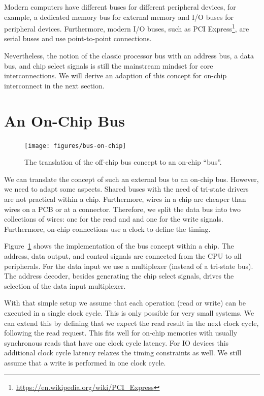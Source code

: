 \documentclass[%
    10pt,
    headinclude, footexclude,
    openright, %
    notitlepage,
    cleardoubleempty,
    headsepline,
    pointlessnumbers,
    bibtotoc, idxtotoc,
    ]{scrbook}
\newcommand{\myref}[2]{\href{#1}{#2}}
\renewcommand{\myref}[2]{{#2}{\footnote{\url{#1}}}}
\begin{document}
Modern computers have different buses for different peripheral devices, for example, a dedicated memory
bus for external memory and I/O buses for peripheral devices.
Furthermore, modern I/O buses, such as \myref{https://en.wikipedia.org/wiki/PCI_Express}{PCI Express},
are serial buses and use point-to-point connections.

Nevertheless, the notion of the classic processor bus with an address bus, a data bus, and chip select signals
is still the mainstream mindset for core interconnections. We will derive an adaption of this concept for
on-chip interconnect in the next section.

\section{An On-Chip Bus}

\begin{figure}
  \centering
  \texttt{[image: figures/bus-on-chip]}
  \caption{The translation of the off-chip bus concept to an on-chip ``bus''.}
  \label{fig:bus-on-chip}
\end{figure}

We can translate the concept of such an external bus to an on-chip bus. However, we need to adapt some aspects.
Shared buses with the need of tri-state drivers are not practical within a chip. Furthermore,
wires in a chip are cheaper than wires on a PCB or at a connector. Therefore, we split the data bus
into two collections of wires: one for the read and and one for the write signals.
Furthermore, on-chip connections use a clock to define the timing.

Figure~\ref{fig:bus-on-chip} shows the implementation of the bus concept within a chip.
The address, data output, and control signals are connected from the CPU to all peripherals.
For the data input we use a multiplexer (instead of a tri-state bus).
The address decoder, besides generating the chip select signals, drives the selection of
the data input multiplexer.

With that simple setup we assume that each operation (read or write) can be executed in
a single clock cycle. This is only possible for very small systems. We can extend this by defining
that we expect the read result in the next clock cycle, following the read request. This fits
well for on-chip memories with usually synchronous reads that have one clock cycle latency.
For IO devices this additional clock cycle latency relaxes the timing constraints as well.
We still assume that a write is performed in one clock cycle.
\end{document}
